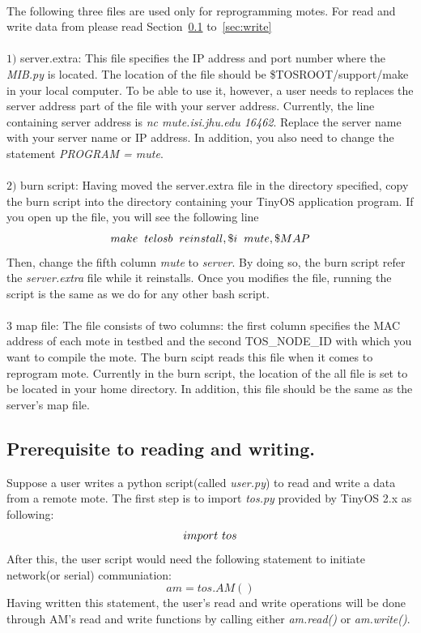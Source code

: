 \documentclass[10pt,conference]{IEEEtran}
\newcommand\spar[1]{\vspace{1ex}\noindent{\bf #1}}
\begin{document}
\spar{3. Your PC}\\
The following three files are used only for reprogramming motes. For read and 
write data from please read Section~\ref{sec:prereq} to~\ref{sec:write} \\\\
$1)$ server.extra:  This file specifies the IP address and port number where
the \textit{MIB.py} is located.  The location of the file should be
\$TOSROOT/support/make in your local computer.  To be able to use it, however,
a user needs to replaces the server address part of the file with your server
address.  Currently, the line containing server address is \textit{nc
mute.isi.jhu.edu 16462}.  Replace the server name with your server name or IP
address.  In addition, you also need to change the statement \textit{PROGRAM =
mute}. \\\\
$2)$ burn script: Having moved the server.extra file in the directory specified, 
copy the burn script into the directory containing your TinyOS application program. 
If you open up the file, you will see the following line 
\[
make\hspace{2.0mm} telosb\hspace{2.0mm} reinstall,\$i\hspace{2.0mm} mute,\$MAP
\]
Then, change the fifth column \textit{mute} to \textit{server}. By doing so, 
the burn script refer the \textit{server.extra} file while it reinstalls. 
Once you modifies the file, running the script is the same as we do for any
other bash script. \\\\
$3$ map file: The file consists of two columns: the first column specifies
the MAC address of each mote in testbed and the second TOS\_NODE\_ID with which
you want to compile the mote.  The burn scipt reads this file when it comes to
reprogram mote.  Currently in the burn script, the location of the all file is
set to be located in your home directory. In addition, this file should be the 
same as the server's map file. 

\subsection{Prerequisite to reading and writing.} 
\label{sec:prereq}

Suppose a user writes a python
script(called \textit{user.py}) to read and write a data from a remote
mote.  The first step is to import \textit{tos.py} provided by TinyOS 2.x as
following:
\[
import \hspace{1.2mm} tos 
\]
After this, the user script would need the following statement to initiate 
network(or serial) communiation: 
\[
am = tos.AM()
\]
Having written this statement, the user's read and write operations will be
done through AM's read and write functions by calling either \textit{am.read()}
or \textit{am.write()}.
\end{document}
